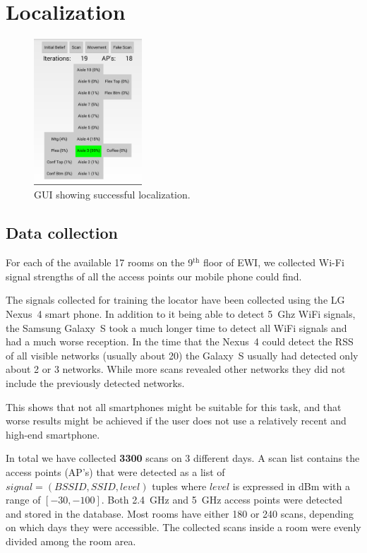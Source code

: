 \documentclass[a4paper,10pt,twoside]{IEEEtran}
\begin{document}
\section{Localization}
\label{sec:localization}

\begin{figure}
  \centering
    \includegraphics[width=0.36\textwidth]{screenshot}
    \caption{GUI showing successful localization.}
    \label{fig:screenshot}
\end{figure}

\subsection{Data collection}
\label{sec:loc-localization-method}
For each of the available 17 rooms on the 9$^{\text{th}}$ floor of EWI, we collected Wi-Fi signal strengths of all the access points our mobile phone could find.

The signals collected for training the locator have been collected using the LG Nexus~4 smart phone.
In addition to it being able to detect 5~Ghz WiFi signals, the Samsung Galaxy~S took a much longer time to detect all WiFi signals and had a much worse reception.
In the time that the Nexus~4 could detect the RSS of all visible networks (usually about 20) the Galaxy~S usually had detected only about 2 or 3 networks. While more scans revealed other networks they did not include the previously detected networks.
  
This shows that not all smartphones might be suitable for this task, and that worse results might be achieved if the user does not use a relatively recent and high-end smartphone.

In total we have collected \textbf{3300} scans on 3 different days.
A scan list contains the access points (AP's) that were detected as a list of $signal = (BSSID, SSID, level)$ tuples where $level$ is expressed in dBm with a range of $[-30,-100]$.
Both 2.4~GHz and 5~GHz access points were detected and stored in the database.
Most rooms have either 180 or 240 scans, depending on which days they were accessible.
The collected scans inside a room were evenly divided among the room area.
\end{document}
